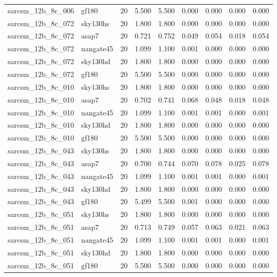 \begin{tabular}{llrrrrrrr}
sarcsm\_12b\_8c\_006 & gf180 & 20 & 5.500 & 5.500 & 0.000 & 0.000 & 0.000 & 0.000 \\
sarcsm\_12b\_8c\_072 & sky130hs & 20 & 1.800 & 1.800 & 0.000 & 0.000 & 0.000 & 0.000 \\
sarcsm\_12b\_8c\_072 & asap7 & 20 & 0.721 & 0.752 & 0.049 & 0.054 & 0.018 & 0.054 \\
sarcsm\_12b\_8c\_072 & nangate45 & 20 & 1.099 & 1.100 & 0.001 & 0.000 & 0.000 & 0.000 \\
sarcsm\_12b\_8c\_072 & sky130hd & 20 & 1.800 & 1.800 & 0.000 & 0.000 & 0.000 & 0.000 \\
sarcsm\_12b\_8c\_072 & gf180 & 20 & 5.500 & 5.500 & 0.000 & 0.000 & 0.000 & 0.000 \\
sarcsm\_12b\_8c\_010 & sky130hs & 20 & 1.800 & 1.800 & 0.000 & 0.000 & 0.000 & 0.000 \\
sarcsm\_12b\_8c\_010 & asap7 & 20 & 0.702 & 0.741 & 0.068 & 0.048 & 0.018 & 0.048 \\
sarcsm\_12b\_8c\_010 & nangate45 & 20 & 1.099 & 1.100 & 0.001 & 0.001 & 0.000 & 0.001 \\
sarcsm\_12b\_8c\_010 & sky130hd & 20 & 1.800 & 1.800 & 0.000 & 0.000 & 0.000 & 0.000 \\
sarcsm\_12b\_8c\_010 & gf180 & 20 & 5.500 & 5.500 & 0.000 & 0.000 & 0.000 & 0.000 \\
sarcsm\_12b\_8c\_043 & sky130hs & 20 & 1.800 & 1.800 & 0.000 & 0.000 & 0.000 & 0.000 \\
sarcsm\_12b\_8c\_043 & asap7 & 20 & 0.700 & 0.744 & 0.070 & 0.078 & 0.025 & 0.078 \\
sarcsm\_12b\_8c\_043 & nangate45 & 20 & 1.099 & 1.100 & 0.001 & 0.001 & 0.000 & 0.001 \\
sarcsm\_12b\_8c\_043 & sky130hd & 20 & 1.800 & 1.800 & 0.000 & 0.000 & 0.000 & 0.000 \\
sarcsm\_12b\_8c\_043 & gf180 & 20 & 5.499 & 5.500 & 0.001 & 0.000 & 0.000 & 0.000 \\
sarcsm\_12b\_8c\_051 & sky130hs & 20 & 1.800 & 1.800 & 0.000 & 0.000 & 0.000 & 0.000 \\
sarcsm\_12b\_8c\_051 & asap7 & 20 & 0.713 & 0.749 & 0.057 & 0.063 & 0.021 & 0.063 \\
sarcsm\_12b\_8c\_051 & nangate45 & 20 & 1.099 & 1.100 & 0.001 & 0.001 & 0.000 & 0.001 \\
sarcsm\_12b\_8c\_051 & sky130hd & 20 & 1.800 & 1.800 & 0.000 & 0.000 & 0.000 & 0.000 \\
sarcsm\_12b\_8c\_051 & gf180 & 20 & 5.500 & 5.500 & 0.000 & 0.000 & 0.000 & 0.000 \\

\end{tabular}
